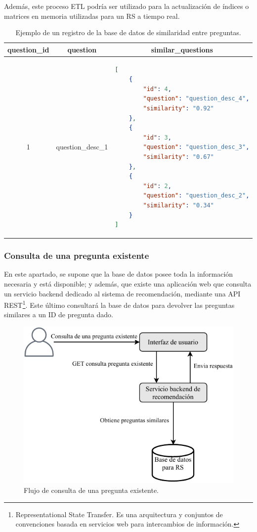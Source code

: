 \bigskip Además, este proceso ETL podría ser utilizado para la actualización de índices o matrices en memoria utilizadas para un RS a tiempo real.

\begin{table}[h!]
	\centering
	\footnotesize
	\caption{Ejemplo de un registro de la base de datos de similaridad entre preguntas.}
	\begin{tabular}{|c|c|l|}
		\hline
		\textbf{question\_id} &
		\textbf{question} &
		\multicolumn{1}{c|}{\textbf{similar\_questions}} \\ \hline
		1 & question\_desc\_1 & \begin{lstlisting}[language=json]
[
	{
		"id": 4,
		"question": "question_desc_4",
		"similarity": "0.92"
	},
	{
		"id": 3,
		"question": "question_desc_3",
		"similarity": "0.67"
	},
	{
		"id": 2,
		"question": "question_desc_2",
		"similarity": "0.34"
	}
]
		\end{lstlisting} \\ \hline
	\end{tabular}
	\label{tab:table-similar-questions}
\end{table}

\subsubsection{Consulta de una pregunta existente}
En este apartado, se supone que la base de datos posee toda la información necesaria y está disponible; y además, que existe una aplicación web que consulta un servicio backend dedicado al sistema de recomendación, mediante una API REST\footnote{Representational State Transfer. Es una arquitectura y conjuntos de convenciones basada en servicios web para intercambios de información.}. Este último consultará la base de datos para devolver las preguntas similares a un ID de pregunta dado.

\begin{figure}[h!]
	\centering
	\includegraphics[width=0.6\linewidth]{8_problema_investigacion/imagenes/implementacion_rs_consulta}
	\caption{Flujo de consulta de una pregunta existente.}
	\label{fig:implementacionrsconsulta}
\end{figure}

